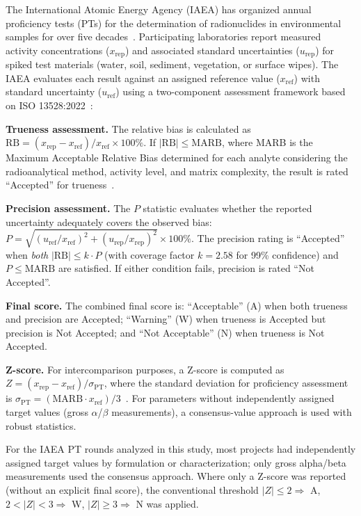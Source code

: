 \documentclass[12pt,a4paper,twoside]{article}
\begin{document}
The International Atomic Energy Agency (IAEA) has organized annual proficiency tests (PTs) for the determination of radionuclides in environmental samples for over five decades~\cite{iaea1989,iaea2017}. Participating laboratories report measured activity concentrations ($x_{\text{rep}}$) and associated standard uncertainties ($u_{\text{rep}}$) for spiked test materials (water, soil, sediment, vegetation, or surface wipes). The IAEA evaluates each result against an assigned reference value ($x_{\text{ref}}$) with standard uncertainty ($u_{\text{ref}}$) using a two-component assessment framework based on ISO 13528:2022~\cite{iso13528}:

\textbf{Trueness assessment.} The relative bias is calculated as $\text{RB} = (x_{\text{rep}} - x_{\text{ref}}) / x_{\text{ref}} \times 100\%$. If $|\text{RB}| \leq \text{MARB}$, where MARB is the Maximum Acceptable Relative Bias determined for each analyte considering the radioanalytical method, activity level, and matrix complexity, the result is rated ``Accepted'' for trueness~\cite{deregge2000}.

\textbf{Precision assessment.} The $P$ statistic evaluates whether the reported uncertainty adequately covers the observed bias: $P = \sqrt{ (u_{\text{ref}}/x_{\text{ref}})^2 + (u_{\text{rep}}/x_{\text{rep}})^2 } \times 100\%$. The precision rating is ``Accepted'' when \emph{both} $|\text{RB}| \leq k \cdot P$ (with coverage factor $k = 2.58$ for 99\% confidence) and $P \leq \text{MARB}$ are satisfied. If either condition fails, precision is rated ``Not Accepted''.

\textbf{Final score.} The combined final score is: ``Acceptable'' (A) when both trueness and precision are Accepted; ``Warning'' (W) when trueness is Accepted but precision is Not Accepted; and ``Not Acceptable'' (N) when trueness is Not Accepted.

\textbf{Z-score.} For intercomparison purposes, a Z-score is computed as $Z = (x_{\text{rep}} - x_{\text{ref}}) / \sigma_{\text{PT}}$, where the standard deviation for proficiency assessment is $\sigma_{\text{PT}} = (\text{MARB} \cdot x_{\text{ref}}) / 3$~\cite{iso13528}. For parameters without independently assigned target values (gross $\alpha$/$\beta$ measurements), a consensus-value approach is used with robust statistics.

For the IAEA PT rounds analyzed in this study, most projects had independently assigned target values by formulation or characterization; only gross alpha/beta measurements used the consensus approach. Where only a Z-score was reported (without an explicit final score), the conventional threshold $|Z| \leq 2 \Rightarrow$ A, $2 < |Z| < 3 \Rightarrow$ W, $|Z| \geq 3 \Rightarrow$ N was applied.
\end{document}
